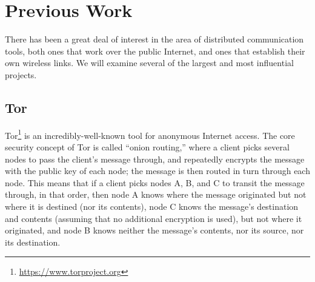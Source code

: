 \documentclass[12pt]{article}
\begin{document}
  \section{Previous Work}
  
  There has been a great deal of interest in the area of distributed communication tools, both ones that work over the public Internet, and ones that establish their own wireless links. We will examine several of the largest and most influential projects.
  
  \subsection{Tor}
  
  Tor\footnote{\url{https://www.torproject.org}} is an incredibly-well-known tool for anonymous Internet access. The core security concept of Tor is called ``onion routing,'' where a client picks several nodes to pass the client's message through, and repeatedly encrypts the message with the public key of each node; the message is then routed in turn through each node. This means that if a client picks nodes A, B, and C to transit the message through, in that order, then node A knows where the message originated but not where it is destined (nor its contents), node C knows the message's destination and contents (assuming that no additional encryption is used), but not where it originated, and node B knows neither the message's contents, nor its source, nor its destination.
  
\end{document}
